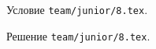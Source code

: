 \problem{}
Условие \texttt{team/junior/8.tex}.

\solution Решение \texttt{team/junior/8.tex}.
\endproblem
